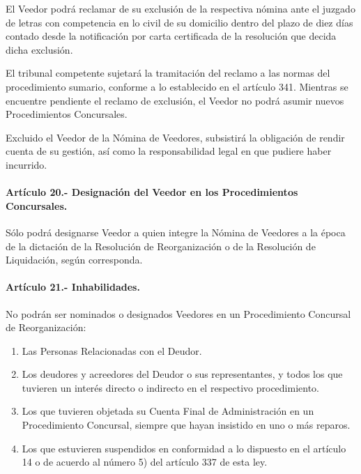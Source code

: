 \documentclass[
]{book}
\begin{document}
El Veedor podrá reclamar de su exclusión de la respectiva nómina ante el juzgado de letras con competencia en lo civil de su domicilio dentro del plazo de diez días contado desde la notificación por carta certificada de la resolución que decida dicha exclusión.

El tribunal competente sujetará la tramitación del reclamo a las normas del procedimiento sumario, conforme a lo establecido en el artículo 341. Mientras se encuentre pendiente el reclamo de exclusión, el Veedor no podrá asumir nuevos Procedimientos Concursales.

Excluido el Veedor de la Nómina de Veedores, subsistirá la obligación de rendir cuenta de su gestión, así como la responsabilidad legal en que pudiere haber incurrido.

\hypertarget{artuxedculo-20.--designaciuxf3n-del-veedor-en-los-procedimientos-concursales.}{%
\paragraph*{Artículo 20.- Designación del Veedor en los Procedimientos Concursales.}\label{artuxedculo-20.--designaciuxf3n-del-veedor-en-los-procedimientos-concursales.}}

Sólo podrá designarse Veedor a quien integre la Nómina de Veedores a la época de la dictación de la Resolución de Reorganización o de la Resolución de Liquidación, según corresponda.

\hypertarget{artuxedculo-21.--inhabilidades.}{%
\paragraph*{Artículo 21.- Inhabilidades.}\label{artuxedculo-21.--inhabilidades.}}

No podrán ser nominados o designados Veedores en un Procedimiento Concursal de Reorganización:

\begin{enumerate}
\def\labelenumi{\arabic{enumi})}
\item
  Las Personas Relacionadas con el Deudor.
\item
  Los deudores y acreedores del Deudor o sus representantes, y todos los que tuvieren un interés directo o indirecto en el respectivo procedimiento.
\item
  Los que tuvieren objetada su Cuenta Final de Administración en un Procedimiento Concursal, siempre que hayan insistido en uno o más reparos.
\item
  Los que estuvieren suspendidos en conformidad a lo dispuesto en el artículo 14 o de acuerdo al número 5) del artículo 337 de esta ley.
\end{enumerate}
\end{document}
